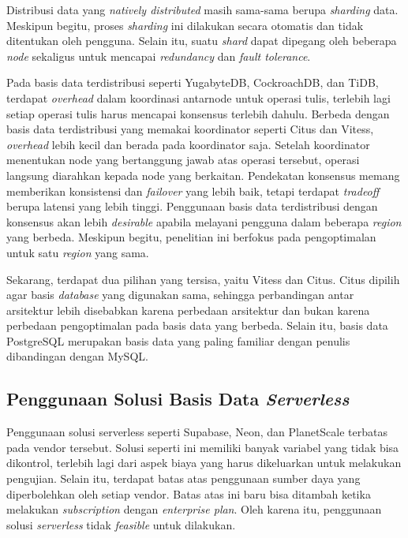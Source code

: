 Distribusi data yang \textit{natively distributed} masih sama-sama berupa \textit{sharding} data. Meskipun begitu, proses \textit{sharding} ini dilakukan secara otomatis dan tidak ditentukan oleh pengguna. Selain itu, suatu \textit{shard} dapat dipegang oleh beberapa \textit{node} sekaligus untuk mencapai \textit{redundancy} dan \textit{fault tolerance}.

Pada basis data terdistribusi seperti YugabyteDB, CockroachDB, dan TiDB, terdapat \textit{overhead} dalam koordinasi antarnode untuk operasi tulis, terlebih lagi setiap operasi tulis harus mencapai konsensus terlebih dahulu. Berbeda dengan basis data terdistribusi yang memakai koordinator seperti Citus dan Vitess, \textit{overhead} lebih kecil dan berada pada koordinator saja. Setelah koordinator menentukan node yang bertanggung jawab atas operasi tersebut, operasi langsung diarahkan kepada node yang berkaitan. Pendekatan konsensus memang memberikan konsistensi dan \textit{failover} yang lebih baik, tetapi terdapat \textit{tradeoff} berupa latensi yang lebih tinggi. Penggunaan basis data terdistribusi dengan konsensus akan lebih \textit{desirable} apabila melayani pengguna dalam beberapa \textit{region} yang berbeda. Meskipun begitu, penelitian ini berfokus pada pengoptimalan untuk satu \textit{region} yang sama.

Sekarang, terdapat dua pilihan yang tersisa, yaitu Vitess dan Citus. Citus dipilih agar basis \textit{database} yang digunakan sama, sehingga perbandingan antar arsitektur lebih disebabkan karena perbedaan arsitektur dan bukan karena perbedaan pengoptimalan pada basis data yang berbeda. Selain itu, basis data PostgreSQL merupakan basis data yang paling familiar dengan penulis dibandingan dengan MySQL.

\subsection{Penggunaan Solusi Basis Data \textit{Serverless}}

Penggunaan solusi serverless seperti Supabase, Neon, dan PlanetScale terbatas pada vendor tersebut. Solusi seperti ini memiliki banyak variabel yang tidak bisa dikontrol, terlebih lagi dari aspek biaya yang harus dikeluarkan untuk melakukan pengujian. Selain itu, terdapat batas atas penggunaan sumber daya yang diperbolehkan oleh setiap vendor. Batas atas ini baru bisa ditambah ketika melakukan \textit{subscription} dengan \textit{enterprise plan}. Oleh karena itu, penggunaan solusi \textit{serverless} tidak \textit{feasible} untuk dilakukan.

